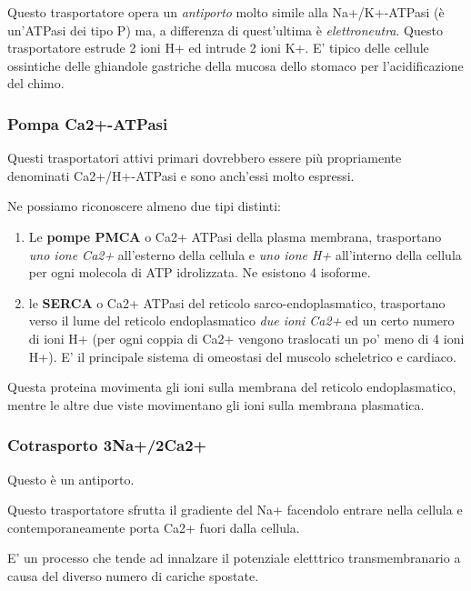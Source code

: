 \documentclass[]{article}
\begin{document}
Questo trasportatore opera un \emph{antiporto} molto simile alla
Na+/K+-ATPasi (è un'ATPasi dei tipo P) ma, a differenza di quest'ultima
è \emph{elettroneutra}. Questo trasportatore estrude 2 ioni H+ ed
intrude 2 ioni K+. E' tipico delle cellule ossintiche delle ghiandole
gastriche della mucosa dello stomaco per l'acidificazione del chimo.

\subsubsection{Pompa Ca2+-ATPasi}\label{pompa-ca2-atpasi}

Questi trasportatori attivi primari dovrebbero essere più propriamente
denominati Ca2+/H+-ATPasi e sono anch'essi molto espressi.

Ne possiamo riconoscere almeno due tipi distinti:

\begin{enumerate}
\def\labelenumi{\arabic{enumi}.}
\itemsep1pt\parskip0pt
\item
  Le \textbf{pompe PMCA} o Ca2+ ATPasi della plasma membrana,
  trasportano \emph{uno ione Ca2+} all'esterno della cellula e \emph{uno
  ione H+} all'interno della cellula per ogni molecola di ATP
  idrolizzata. Ne esistono 4 isoforme.
\item
  le \textbf{SERCA} o Ca2+ ATPasi del reticolo sarco-endoplasmatico,
  trasportano verso il lume del reticolo endoplasmatico \emph{due ioni
  Ca2+} ed un certo numero di ioni H+ (per ogni coppia di Ca2+ vengono
  traslocati un po' meno di 4 ioni H+). E' il principale sistema di
  omeostasi del muscolo scheletrico e cardiaco.
\end{enumerate}

Questa proteina movimenta gli ioni sulla membrana del reticolo
endoplasmatico, mentre le altre due viste movimentano gli ioni sulla
membrana plasmatica.

\subsubsection{Cotrasporto 3Na+/2Ca2+}\label{cotrasporto-3na2ca2}

Questo è un antiporto.

Questo trasportatore sfrutta il gradiente del Na+ facendolo entrare
nella cellula e contemporaneamente porta Ca2+ fuori dalla cellula.

E' un processo che tende ad innalzare il potenziale eletttrico
transmembranario a causa del diverso numero di cariche spostate.
\end{document}
